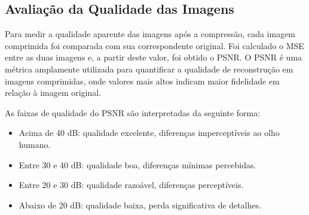 \subsection{Avaliação da Qualidade das Imagens}

Para medir a qualidade aparente das imagens após a compressão, cada imagem comprimida foi comparada com sua correspondente original. Foi calculado o \acrfull{MSE} entre as duas imagens e, a partir deste valor, foi obtido o \acrfull{PSNR}. O \acrshort{PSNR} é uma métrica amplamente utilizada para quantificar a qualidade de reconstrução em imagens comprimidas, onde valores mais altos indicam maior fidelidade em relação à imagem original.

As faixas de qualidade do \acrshort{PSNR} são interpretadas da seguinte forma:

\begin{itemize}
    \item Acima de 40 dB: qualidade excelente, diferenças imperceptíveis ao olho humano.
    \item Entre 30 e 40 dB: qualidade boa, diferenças mínimas percebidas.
    \item Entre 20 e 30 dB: qualidade razoável, diferenças perceptíveis.
    \item Abaixo de 20 dB: qualidade baixa, perda significativa de detalhes.
\end{itemize}





